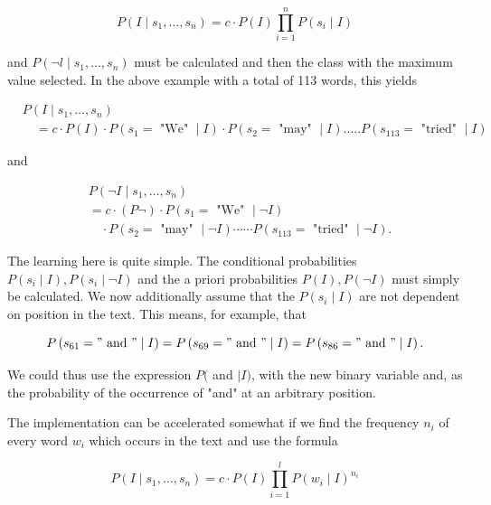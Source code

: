 \documentclass[10pt]{article}
\begin{document}
\begin{equation*}
P\left(I \mid s_{1}, \ldots, s_{n}\right)=c \cdot P(I) \prod_{i=1}^{n} P\left(s_{i} \mid I\right) \tag{8.9}
\end{equation*}


and $P\left(\neg l \mid s_{1}, \ldots, s_{n}\right)$ must be calculated and then the class with the maximum value selected. In the above example with a total of 113 words, this yields

$$
\begin{aligned}
& P\left(I \mid s_{1}, \ldots, s_{n}\right) \\
& \quad=c \cdot P(I) \cdot P\left(s_{1}=\text { "We" } \mid I\right) \cdot P\left(s_{2}=\text { "may" } \mid I\right) \ldots . . P\left(s_{113}=\text { "tried" } \mid I\right)
\end{aligned}
$$

and

$$
\begin{aligned}
& P\left(\neg I \mid s_{1}, \ldots, s_{n}\right) \\
& =c \cdot(P \neg) \cdot P\left(s_{1}=\text { "We" } \mid \neg I\right) \\
& \quad \cdot P\left(s_{2}=\text { "may" } \mid \neg I\right) \cdots \cdots P\left(s_{113}=\text { "tried" } \mid \neg I\right) .
\end{aligned}
$$

The learning here is quite simple. The conditional probabilities $P\left(s_{i} \mid I\right), P\left(s_{i} \mid \neg I\right)$ and the a priori probabilities $P(I), P(\neg I)$ must simply be calculated. We now additionally assume that the $P\left(s_{i} \mid I\right)$ are not dependent on position in the text. This means, for example, that

$$
P\left(s_{61}=" \text { and } " \mid I\right)=P\left(s_{69}=" \text { and } " \mid I\right)=P\left(s_{86}=" \text { and } " \mid I\right) .
$$

We could thus use the expression $P($ and $\mid I)$, with the new binary variable and, as the probability of the occurrence of "and" at an arbitrary position.

The implementation can be accelerated somewhat if we find the frequency $n_{i}$ of every word $w_{i}$ which occurs in the text and use the formula


\begin{equation*}
P\left(I \mid s_{1}, \ldots, s_{n}\right)=c \cdot P(I) \prod_{i=1}^{l} P\left(w_{i} \mid I\right)^{n_{i}} \tag{8.10}
\end{equation*}
\end{document}
